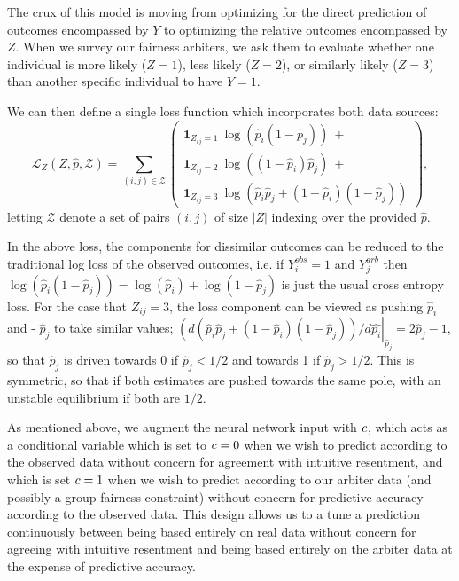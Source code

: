     The crux of this model is moving from optimizing for the direct prediction of outcomes encompassed by $Y$ to optimizing the relative outcomes encompassed by $Z$.  When we survey our fairness arbiters, we ask them to evaluate whether one individual is more likely ($Z = 1$), less likely ($Z = 2$), or similarly likely ($Z = 3$) than another specific individual to have $Y = 1$.
    
    We can then define a single loss function which incorporates both data sources:
    $$ \mathcal{L}_Z(Z, \hat{p}, \mathcal{Z}) = \sum\limits_{(i, j) \in \mathcal{Z}} \left(\begin{array}{l} 
        \mathbf{1}_{Z_{ij} = 1} ~ \log\left( \hat{p}_i (1 - \hat{p}_j)  \right) ~ + \\
        \mathbf{1}_{Z_{ij} = 2} ~ \log\left( (1 - \hat{p}_i) \hat{p}_j  \right) ~ + \\
        \mathbf{1}_{Z_{ij} = 3} ~ \log\left(\hat{p}_i \hat{p}_j + (1 - \hat{p}_i)(1 - \hat{p}_j) \right)
        \end{array}\right), \label{eq:sm_pairwise_loss}$$
    letting $\mathcal{Z}$ denote a set of pairs $(i, j)$ of size $|Z|$ indexing over the provided $\hat{p}$.
    
    In the above loss, the components for dissimilar outcomes can be reduced to the traditional log loss of the observed outcomes, i.e. if $Y_i^{obs} = 1$ and $Y_j^{arb}$ then 
        $ \log\left( \hat{p}_i (1 - \hat{p}_j)  \right) = \log\left( \hat{p}_i \right) + \log\left(1 - \hat{p}_j  \right)$ 
    is just the usual cross entropy loss.  For the case that $Z_{ij} = 3$, the loss component can be viewed as pushing $\hat{p}_i$ and  - $\hat{p}_j$ to take similar values; $\left(d \left(\hat{p}_i \hat{p}_j + (1 - \hat{p}_i)(1 - \hat{p}_j) \right)/d\hat{p_i}\right|_{\hat{p}_j} = 2\hat{p}_j - 1$, so that $\hat{p}_j$ is driven towards 0 if $\hat{p}_j < 1/2$ and towards 1 if $\hat{p}_j > 1/2$.  This is symmetric, so that if both estimates are pushed towards the same pole, with an unstable equilibrium if both are $1/2$.

    As mentioned above, we augment the neural network input with $c$, which acts as a conditional variable which is set to $c = 0$ when we wish to predict according to the observed data without concern for agreement with intuitive resentment, and which is set $c = 1$ when we wish to predict according to our arbiter data (and possibly a group fairness constraint) without concern for predictive accuracy according to the observed data.  This design allows us to a tune a prediction continuously between being based entirely on real data without concern for agreeing with intuitive resentment and being based entirely on the arbiter data at the expense of predictive accuracy.
    

